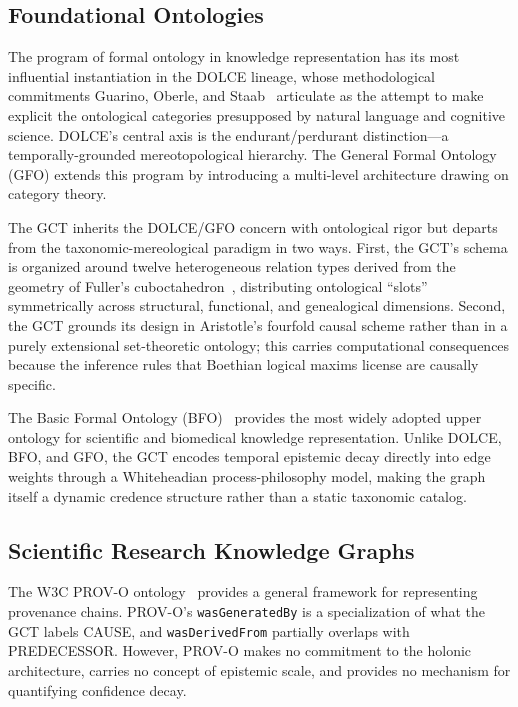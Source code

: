 \documentclass{iosart2x}
\begin{document}
\subsection{Foundational Ontologies}

The program of formal ontology in knowledge representation has its most influential instantiation in the DOLCE lineage, whose methodological commitments Guarino, Oberle, and Staab~\cite{guarino2009ontology} articulate as the attempt to make explicit the ontological categories presupposed by natural language and cognitive science. DOLCE's central axis is the endurant/perdurant distinction---a temporally-grounded mereotopological hierarchy. The General Formal Ontology (GFO) extends this program by introducing a multi-level architecture drawing on category theory.

The GCT inherits the DOLCE/GFO concern with ontological rigor but departs from the taxonomic-mereological paradigm in two ways. First, the GCT's schema is organized around twelve heterogeneous relation types derived from the geometry of Fuller's cuboctahedron~\cite{fuller1975synergetics}, distributing ontological ``slots'' symmetrically across structural, functional, and genealogical dimensions. Second, the GCT grounds its design in Aristotle's fourfold causal scheme rather than in a purely extensional set-theoretic ontology; this carries computational consequences because the inference rules that Boethian logical maxims license are causally specific.

The Basic Formal Ontology (BFO)~\cite{arp2015bfo} provides the most widely adopted upper ontology for scientific and biomedical knowledge representation. Unlike DOLCE, BFO, and GFO, the GCT encodes temporal epistemic decay directly into edge weights through a Whiteheadian process-philosophy model, making the graph itself a dynamic credence structure rather than a static taxonomic catalog.

\subsection{Scientific Research Knowledge Graphs}

The W3C PROV-O ontology~\cite{moreau2013prov} provides a general framework for representing provenance chains. PROV-O's \texttt{wasGeneratedBy} is a specialization of what the GCT labels CAUSE, and \texttt{wasDerivedFrom} partially overlaps with PREDECESSOR. However, PROV-O makes no commitment to the holonic architecture, carries no concept of epistemic scale, and provides no mechanism for quantifying confidence decay.
\end{document}
